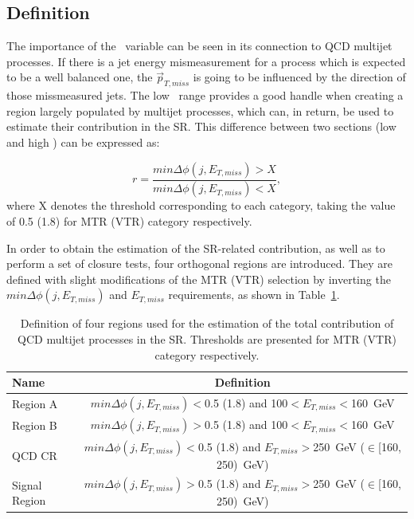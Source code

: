 \subsection{Definition}

\hspace{10pt} The importance of the \mindphi~variable can be seen in its connection to QCD multijet processes. If there is a jet energy mismeasurement for a process which is expected to be a well balanced one, the $\vec{p}_{T,miss}$ is going to be influenced by the direction of those missmeasured jets. The low \mindphi~range provides a good handle when creating a region largely populated by multijet processes, which can, in return, be used to estimate their contribution in the SR. This difference between two sections (low and high \mindphi) can be expressed as:

\begin{equation}
    r = \frac{min\Delta\phi(j, E_{T,miss})>X}{min\Delta\phi(j, E_{T,miss})<X},
\end{equation}
where X denotes the threshold corresponding to each category, taking the value of 0.5 (1.8) for MTR (VTR) category respectively.

\hspace{10pt} In order to obtain the estimation of the SR-related contribution, as well as to perform a set of closure tests, four orthogonal regions are introduced. They are defined with slight modifications of the MTR (VTR) selection by inverting the $min\Delta\phi(j, E_{T,miss})$ and $E_{T,miss}$ requirements, as shown in Table~\ref{tab:QCD_regions}.

\begin{table}[htbp]
\centering
\small
\begin{tabular}{lc}
\hline\hline
Name & Definition\\\hline
Region A &  $min\Delta\phi(j, E_{T,miss})<$0.5 (1.8) and 100$<E_{T,miss}<$160~GeV \\
Region B & $min\Delta\phi(j, E_{T,miss})>$0.5 (1.8) and 100$<E_{T,miss}<$160~GeV   \\
QCD CR   & $min\Delta\phi(j, E_{T,miss})<$0.5 (1.8) and $E_{T,miss}>$250~GeV ($\in$[160, 250)~GeV)   \\
Signal Region &  $min\Delta\phi(j, E_{T,miss})>$0.5 (1.8) and $E_{T,miss}>$250~GeV ($\in$[160, 250)~GeV)   \\

\hline\hline
\end{tabular}
\caption{Definition of four regions used for the estimation of the total contribution of QCD multijet processes in the SR. Thresholds are presented for MTR (VTR) category respectively.\label{tab:QCD_regions} }
\end{table}

